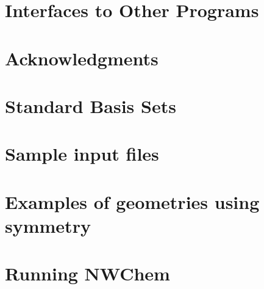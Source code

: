 \chapter{Interfaces to Other Programs}


\clearpage
\chapter{Acknowledgments}

\clearpage

\appendix

\chapter{Standard Basis Sets}


\chapter{Sample input files}


\chapter{Examples of geometries using symmetry}


\chapter{Running NWChem}


